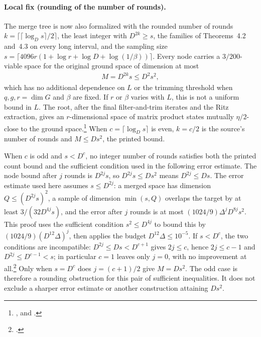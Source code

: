 \documentclass{article}
\begin{document}
\paragraph{Local fix (rounding of the number of rounds).}
The merge tree is now also formalized with the rounded number of rounds
$k=\lceil\lceil\log_Ds\rceil/2\rceil$, the least integer with $D^{2k}\ge s$,
the families of Theorems~4.2 and~4.3 on every long interval, and the
sampling size $s=\lceil4096r(1+\log r+\log D+\log(1/\beta))\rceil$. Every
node carries a $3/200$-viable space for the original ground space of
dimension at most
\begin{align}
    M=D^{2k}s\le D^2s^2,
    \label{eq:alvv16_approximation_parameters_rounded_node_bound}
\end{align}
which has no additional dependence on $L$ or the trimming threshold when
$q,g,r=\dim G$ and $\beta$ are fixed. If $r$ or $\beta$ varies with $L$,
this is not a uniform bound in $L$. The root, after the
final filter-and-trim iterates and the Ritz extraction, gives an
$r$-dimensional space of matrix product states mutually $\eta/2$-close to the
ground
space.\footnote{,
 and
.}
When $c=\lceil\log_Ds\rceil$ is even, $k=c/2$ is the source's number of rounds
and $M\le Ds^2$, the printed bound.

When $c$ is odd and $s<D^c$, no integer number of rounds
satisfies both the printed count bound and the sufficient condition used
in the following error estimate. The node bound after $j$
rounds is $D^{2j}s$, so $D^{2j}s\le Ds^2$ means $D^{2j}\le Ds$. The error
estimate used here assumes $s\le D^{2j}$: a merged space has dimension
$Q\le(D^{2j}s)^2$, a sample of dimension $\min(s,Q)$ overlaps the target by at least
$3/(32D^{4j}s)$, and the error after $j$ rounds is at most
$(1024/9)\Delta^jD^{8j}s^2$. This proof uses the sufficient condition
$s^2\le D^{4j}$ to bound this by $(1024/9)(D^{12}\Delta)^j$, then applies
the budget $D^{12}\Delta\le10^{-5}$. If $s<D^c$,
the two conditions are incompatible: $D^{2j}\le Ds<D^{c+1}$ gives
$2j\le c$, hence $2j\le c-1$ and $D^{2j}\le D^{c-1}<s$; in particular $c=1$
leaves only $j=0$, with no improvement at
all.\footnote{.}
Only when $s=D^c$ does $j=(c+1)/2$ give $M=Ds^2$. The odd case is therefore
a rounding obstruction for this pair of sufficient inequalities. It does not
exclude a sharper error estimate or another construction attaining $Ds^2$.
\end{document}
